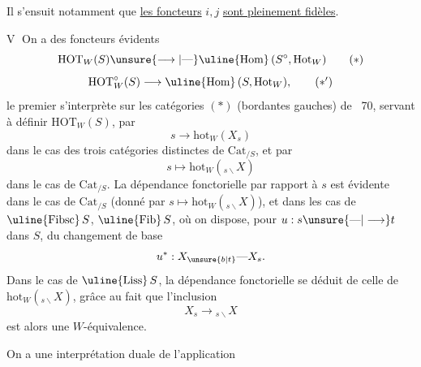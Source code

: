 Il s'ensuit notamment que \uline{les foncteurs} $i,j$ \uline{sont pleinement fidèles}. 

\textcircled{V} On a des foncteurs évidents
\[
 \mathrm{HOT}_W(S)\unsure{\longrightarrow|\text{---}}\text{\uline{Hom}}\,(S^\circ,\mathrm{Hot}_W)
 \tag*{$(*)$}
\]
\[
 \mathrm{HOT}^\circ_W(S)\longrightarrow\text{\uline{Hom}}\,(S,\mathrm{Hot}_W),
 \tag*{$(*')$}
\]
le premier s'interprète sur les  catégories $(*)$   (bordantes gauches) de ~70,  servant à définir $\mathrm{HOT}_W(S)$, par
\[
 s\longrightarrow\mathrm{hot}_W(X_s)
\]
dans le cas des trois catégories distinctes de $\mathrm{Cat}_{/S}$, et par
\[
 s\longmapsto\mathrm{hot}_W({}_{s\backslash}X)
\]
dans le cas de $\mathrm{Cat}_{/S}$. La dépendance fonctorielle par rapport à $s$ est évidente dans le cas de $\mathrm{Cat}_{/S}$ (donné par $s\mapsto\mathrm{hot}_W({}_{s\backslash}X)$), et dans les cas de $\text{\uline{Fibsc}}\,S$, $\text{\uline{Fib}}\,S$, où on dispose, pour $u:s\unsure{\text{---}|\longrightarrow}t$ dans $S$, du changement de base
\[
 u^*:X_{\unsure{b|t}}\text{---}X_s.
\]
Dans le cas de $\text{\uline{Liss}}\,S$, la dépendance fonctorielle se déduit de celle  de $\mathrm{hot}_W({}_{s\backslash}X)$, grâce au fait que l'inclusion
\[
 X_s\longrightarrow{}_{s\backslash}X
\]
est alors une $W$-équivalence.

On a une interprétation duale de l'application
